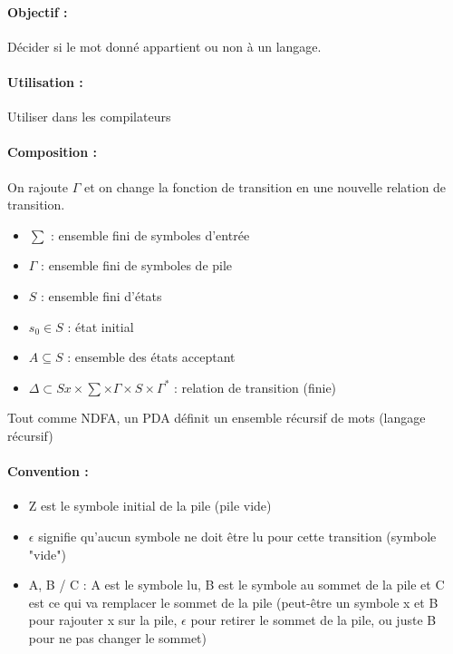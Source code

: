 \paragraph{Objectif :} Décider si le mot donné appartient ou non à un langage.

\paragraph{Utilisation :} Utiliser dans les compilateurs

\paragraph{Composition :}
On rajoute $\Gamma$ et on change la fonction de transition en une nouvelle 
relation de transition.
\begin{itemize}
	\item $\sum$ : ensemble fini de symboles d'entrée
	\item $\Gamma$ : ensemble fini de symboles de pile
	\item $S$ : ensemble fini d'états
	\item $s_0 \in S$ : état initial
	\item $A \subseteq S$ : ensemble des états acceptant
	\item $\Delta \subset Sx\times \sum \times \Gamma \times S \times 
		\Gamma^*$ : relation de transition (finie)
\end{itemize}

\begin{myprop}
	Tout comme NDFA, un PDA définit un ensemble récursif de mots (langage 
	récursif)
\end{myprop}

\paragraph{Convention :} 
\begin{itemize}
	\item Z est le symbole initial de la pile (pile vide)
	\item $\epsilon$ signifie qu’aucun symbole ne doit être lu pour cette 
		transition (symbole "vide")
	\item A, B / C : A est le symbole lu, B est le symbole au 
		sommet de la pile et C est ce qui va remplacer le 
		sommet de la pile (peut-être un symbole x et B pour 
		rajouter x sur la pile, $\epsilon$ pour retirer le sommet de la pile, 
		ou juste B pour ne pas changer le sommet)
\end{itemize}

